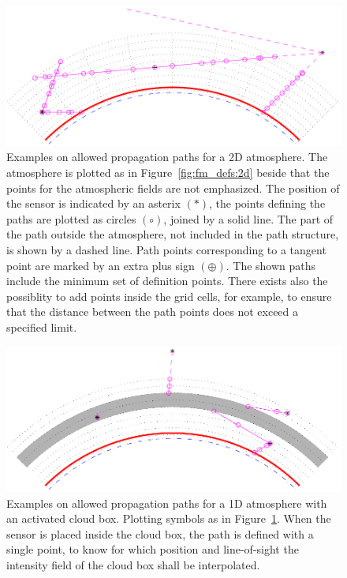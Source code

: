 \begin{figure}[!p]
 \begin{center}
  \includegraphics*[width=0.95\hsize]{Figs/fm_definitions/ppath_cases2}
  \caption{Examples on allowed propagation paths for a 2D atmosphere. 
    The atmosphere is plotted as in Figure~\ref{fig:fm_defs:2d} beside
    that the points for the atmospheric fields are not emphasized.
    The position of the sensor is indicated by an asterix $(\ast)$,
    the points defining the paths are plotted as circles $(\circ)$,
    joined by a solid line. The part of the path outside the
    atmosphere, not included in the path structure, is shown by a
    dashed line. Path points corresponding to a tangent point are
    marked by an extra plus sign $(\oplus)$. The shown paths include
    the minimum set of definition points. There exists also the
    possiblity to add points inside the grid cells, for example, to
    ensure that the distance between the path points does not exceed
    a specified limit.}
  \label{fig:fm_defs:ppath_cases2}
 \end{center}
\end{figure}

\begin{figure}[!p]
 \begin{center}
  \includegraphics*[width=0.95\hsize]{Figs/fm_definitions/ppath_cases1}
  \caption{Examples on allowed propagation paths for a 1D atmosphere
    with an activated cloud box. Plotting symbols as in
    Figure~\ref{fig:fm_defs:ppath_cases2}. When the sensor is placed 
    inside the cloud box, the path is defined with a single point, 
    to know for which position and line-of-sight the intensity field of
    the cloud box shall be interpolated. }
  \label{fig:fm_defs:ppath_cases1}
 \end{center}
\end{figure}

